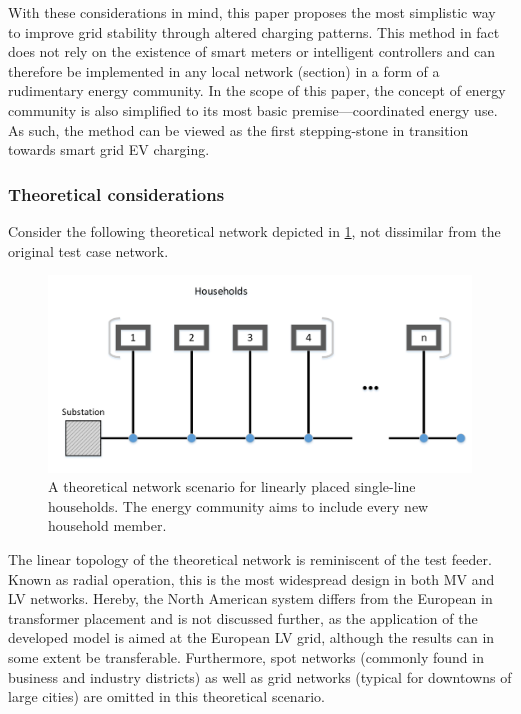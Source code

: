 \documentclass[a4paper,10pt]{report}
\begin{document}
With these considerations in mind, this paper proposes the most simplistic way to improve grid stability through altered charging patterns. This method in fact does not rely on the existence of smart meters or intelligent controllers and can therefore be implemented in any local network (section) in a form of a rudimentary energy community. In the scope of this paper, the concept of energy community is also simplified to its most basic premise---coordinated energy use. As such, the method can be viewed as the first stepping-stone in transition towards smart grid EV charging. 

\subsubsection{Theoretical considerations}

Consider the following theoretical network depicted in \cref{comm_topology}, not dissimilar from the original test case network.

\begin{figure}[htpb]
	\centering
	\includegraphics[width=0.7\linewidth]{comm_topology}
	\caption[Theoretical energy community network scenario]{A theoretical network scenario for linearly placed single-line households. The energy community aims to include every new household member.}
	\label{comm_topology}
\end{figure}


The linear topology of the theoretical network is reminiscent of the test feeder. Known as radial operation, this is the most widespread design in both MV and LV networks. Hereby, the North American system differs from the European in transformer placement and is not discussed further, as the application of the developed model is aimed at the European LV grid, although the results can in some extent be transferable. Furthermore, spot networks (commonly found in business and industry districts) as well as grid networks (typical for downtowns of large cities) are omitted in this theoretical scenario.
\end{document}

